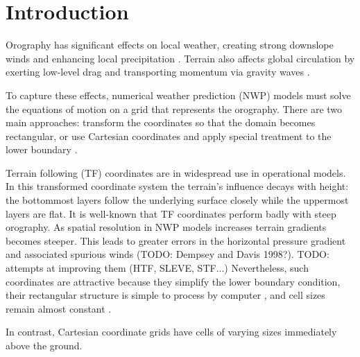 \chapter{Introduction}



Orography has significant effects on local weather, creating strong downslope winds and enhancing local precipitation \autocite{TODO}.  Terrain also affects global circulation by exerting low-level drag \autocite{lott-miller1997} and transporting momentum via gravity waves \autocite{mcfarlane1987}.

To capture these effects, numerical weather prediction (NWP) models must solve the equations of motion on a grid that represents the orography.  There are two main approaches: transform the coordinates so that the domain becomes rectangular, or use Cartesian coordinates and apply special treatment to the lower boundary \autocite{galchen-somerville1975}.

Terrain following (TF) coordinates are in widespread use in operational models.  In this transformed coordinate system the terrain's influence decays with height: the bottommost layers follow the underlying surface closely while the uppermost layers are flat.  It is well-known that TF coordinates perform badly with steep orography.  As spatial resolution in NWP models increases terrain gradients becomes steeper.  This leads to greater errors in the horizontal pressure gradient and associated spurious winds (TODO: Dempsey and Davis 1998?).  TODO: attempts at improving them (HTF, SLEVE, STF...)  Nevertheless, such coordinates are attractive because they simplify the lower boundary condition, their rectangular structure is simple to process by computer \autocite{schaer2002}, and cell sizes remain almost constant \autocite{jebens2011}.

In contrast, Cartesian coordinate grids have cells of varying sizes immediately above the ground.  %


